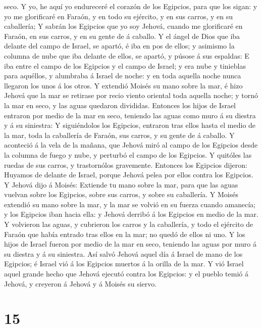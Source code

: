 seco.  Y yo, he aquí yo endureceré el corazón de los
Egipcios, para que los sigan: y yo me glorificaré en Faraón, y en todo
su ejército, y en sus carros, y en su caballería;  Y sabrán
los Egipcios que yo soy Jehová, cuando me glorificaré en Faraón, en sus
carros, y en su gente de á caballo.  Y el ángel de Dios que
iba delante del campo de Israel, se apartó, é iba en pos de ellos; y
asimismo la columna de nube que iba delante de ellos, se apartó, y
púsose á sus espaldas:  E iba entre el campo de los
Egipcios y el campo de Israel; y era nube y tinieblas para aquéllos, y
alumbraba á Israel de noche: y en toda aquella noche nunca llegaron los
unos á los otros.  Y extendió Moisés su mano sobre la mar,
é hizo Jehová que la mar se retirase por recio viento oriental toda
aquella noche; y tornó la mar en seco, y las aguas quedaron divididas.
 Entonces los hijos de Israel entraron por medio de la mar
en seco, teniendo las aguas como muro á su diestra y á su siniestra:
 Y siguiéndolos los Egipcios, entraron tras ellos hasta el
medio de la mar, toda la caballería de Faraón, sus carros, y su gente de
á caballo.  Y aconteció á la vela de la mañana, que Jehová
miró al campo de los Egipcios desde la columna de fuego y nube, y
perturbó el campo de los Egipcios.  Y quitóles las ruedas
de sus carros, y trastornólos gravemente. Entonces los Egipcios dijeron:
Huyamos de delante de Israel, porque Jehová pelea por ellos contra los
Egipcios.  Y Jehová dijo á Moisés: Extiende tu mano sobre
la mar, para que las aguas vuelvan sobre los Egipcios, sobre sus carros,
y sobre su caballería.  Y Moisés extendió su mano sobre la
mar, y la mar se volvió en su fuerza cuando amanecía; y los Egipcios
iban hacia ella: y Jehová derribó á los Egipcios en medio de la mar.
 Y volvieron las aguas, y cubrieron los carros y la
caballería, y todo el ejército de Faraón que había entrado tras ellos en
la mar; no quedó de ellos ni uno.  Y los hijos de Israel
fueron por medio de la mar en seco, teniendo las aguas por muro á su
diestra y á su siniestra.  Así salvó Jehová aquel día á
Israel de mano de los Egipcios; é Israel vió á los Egipcios muertos á la
orilla de la mar.  Y vió Israel aquel grande hecho que
Jehová ejecutó contra los Egipcios: y el pueblo temió á Jehová, y
creyeron á Jehová y á Moisés su siervo.

\hypertarget{section-14}{%
\section{15}\label{section-14}}


